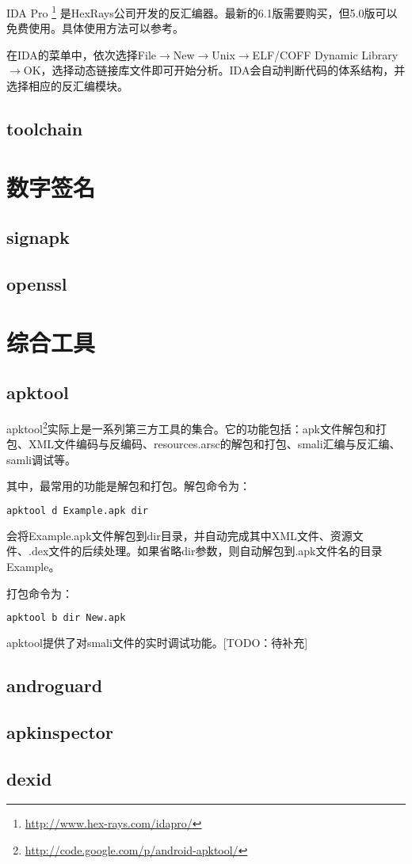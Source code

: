 IDA Pro
\footnote{\url{http://www.hex-rays.com/idapro/}}
是Hex\-Rays公司开发的反汇编器。最新的6.1版需要购买，但5.0版可以免费使用。具体使用方法可以参考\cite{IDA_PRO_BOOK}。

在IDA的菜单中，依次选择File$\rightarrow$New$\rightarrow$Unix$\rightarrow$ELF/COFF Dynamic Library$\rightarrow$OK，选择动态链接库文件即可开始分析。IDA会自动判断代码的体系结构，并选择相应的反汇编模块。
\subsection{toolchain}

\section{数字签名}
\subsection{signapk}
\subsection{openssl}

\section{综合工具}
\subsection{apktool}
apktool\footnote{\url{http://code.google.com/p/android-apktool/}}实际上是一系列第三方工具的集合。它的功能包括：apk文件解包和打包、XML文件编码与反编码、resources.arsc的解包和打包、smali汇编与反汇编、samli调试等。

其中，最常用的功能是解包和打包。解包命令为：
\begin{lstlisting}[language=bash, numbers=none]
apktool d Example.apk dir
\end{lstlisting}
会将Example.apk文件解包到dir目录，并自动完成其中XML文件、资源文件、.dex文件的后续处理。如果省略dir参数，则自动解包到.apk文件名的目录Example。

打包命令为：
\begin{lstlisting}[language=bash, numbers=none]
apktool b dir New.apk
\end{lstlisting}

apktool提供了对smali文件的实时调试功能。[TODO：待补充]
\subsection{androguard}
\subsection{apkinspector}
\subsection{dexid}
